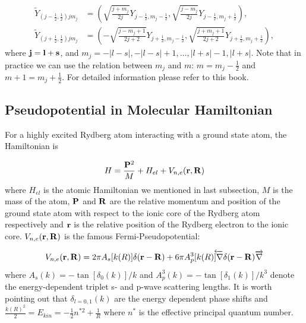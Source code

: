 \documentclass[british,english]{article}
\numberwithin{equation}{section}
\numberwithin{figure}{section}
\begin{document}
\begin{equation}
\begin{aligned}
\tilde{Y}_{(j-\frac{1}{2},\frac{1}{2})j m_{j}}&=\left(\sqrt{\frac{j+m_{j}}{2j}}Y_{j-\frac{1}{2},m_{j}-\frac 12}, \sqrt{\frac{j-m_{j}}{2j}}Y_{j-\frac 12,m_{j}+\frac 12}\right),\\
\tilde{Y}_{(j+\frac{1}{2},\frac{1}{2})jm_{j}}&=\left(-\sqrt{\frac{j-m_{j}+1}{2j+2}}Y_{j+\frac{1}{2},m_{j}-\frac 12}, \sqrt{\frac{j+m_{j}+1}{2j+2}}Y_{j+\frac 12,m_{j}+\frac 12}\right),
\label{equ:spinors}
\end{aligned}
\end{equation}
where $ {\bf j} = {\bf l} + {\bf s}$, and $m_{j} = -|l-s|,-|l-s|+1,\dots,|l+s|-1,|l+s|$. Note that in practice we can use the relation between $m_j$ and $m$: $m=m_j-\frac {1}{2}$ and $m+1 = m_j + \frac{1}{2}$. For detailed information please refer to this book.\cite{Biedenharn1981}
\subsection{Pseudopotential in Molecular Hamiltonian}

For a highly excited Rydberg atom interacting with a ground state
atom, the Hamiltonian is

\begin{equation}
H=\frac{{\bf P}^{2}}{M}+H_{el}+V_{n,e}({\bf r,R})
\end{equation}
where $H_{el}$ is the atomic Hamiltonian we mentioned in last subsection,
$M$ is the mass of the atom, ${\bf P}$ and ${\bf R}$ are the relative
momentum and position of the ground state atom with respect to the
ionic core of the Rydberg atom respectively and ${\bf r}$ is the
relative position of the Rydberg electron to the ionic core. $V_{n,e}({\bf r,R})$
is the famous Fermi-Pseudopotential:

\begin{equation}
V_{n,e}({\bf r,R})=2\pi A_{s}[k(R)]\delta({\bf r}-{\bf R})+6\pi A_{p}^{3}[k(R)\overleftarrow{]\nabla}\delta({\bf r}-{\bf R})\overrightarrow{\nabla}
\end{equation}
where $A_{s}(k)=-\tan[\delta_{0}(k)]/k$ and $A_{p}^{3}(k)=-\tan[\delta_{1}(k)]/k^{3}$
denote the energy-dependent triplet s- and p-wave scattering lengths.
It is worth pointing out that $\delta_{l=0,1}(k)$ are the energy
dependent phase shifts and $\frac{k(R)^{2}}{2}=E_{kin}=-\frac{1}{2}n^{*2}+\frac{1}{R}$
where $n^{*}$ is the effective principal quantum number.
\end{document}
